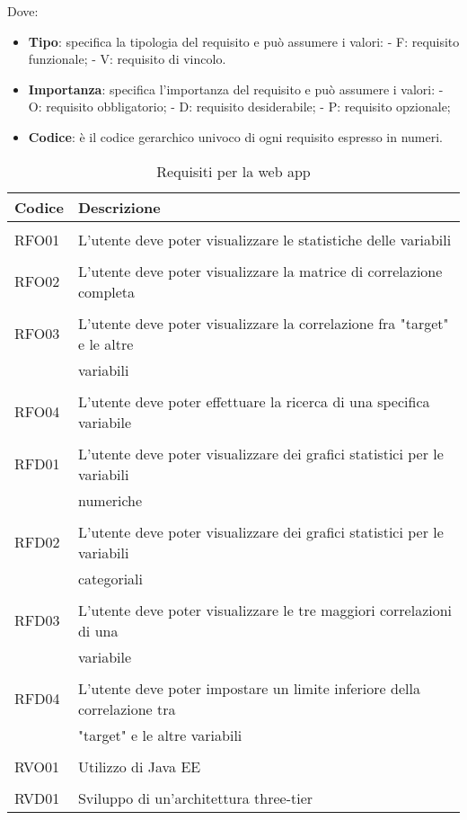 Dove:
\begin{itemize}
	\item \textbf{Tipo}: specifica la tipologia del requisito e può assumere i valori:
	\subitem - F: requisito funzionale;
	\subitem - V: requisito di vincolo.
	\item \textbf{Importanza}: specifica l'importanza del requisito e può assumere i valori:
	\subitem - O: requisito obbligatorio;
	\subitem - D: requisito desiderabile;
	\subitem - P: requisito opzionale; 
	\item  \textbf{Codice}: è il codice gerarchico univoco di ogni requisito espresso in numeri.
\end{itemize} 
\clearpage
\begin{table}[!h] %
	\caption{Requisiti per la web app}
	\label{tab:requisiti-app}
	\centering
	\begin{tabular}{ l | l }
		\textbf{Codice} & \textbf{Descrizione}\\
		\hline
		\hline
		\\[-2.5mm]
		RFO01 & L'utente deve poter visualizzare le statistiche delle variabili \\
		\hline
		\\[-2.5mm]
		RFO02 & L'utente deve poter visualizzare la matrice di correlazione completa \\
		\hline
		\\[-2.5mm]
		RFO03 & L'utente deve poter visualizzare la correlazione fra "target" e le altre \\ & variabili \\
		\hline
		\\[-2.5mm]
		RFO04 & L'utente deve poter effettuare la ricerca di una specifica variabile \\
		\hline
		\hline
		\\[-2.5mm]
		RFD01 & L'utente deve poter visualizzare dei grafici statistici per le variabili \\ & numeriche \\
		\hline
		\\[-2.5mm]
		RFD02 & L'utente deve poter visualizzare dei grafici statistici per le variabili \\ & categoriali \\
		\hline
		\\[-2.5mm]
		RFD03 & L'utente deve poter visualizzare le tre maggiori correlazioni di una \\ & variabile \\
		\hline
		\\[-2.5mm]
		RFD04 & L'utente deve poter impostare un limite inferiore della correlazione tra \\ & "target" e le altre variabili \\
		\hline
		\hline
		\\[-2.5mm]
		RVO01 & Utilizzo di Java EE \\
		\hline
		\hline
		\\[-2.5mm]
		RVD01 & Sviluppo di un'architettura three-tier \\
		\hline
		\end{tabular}
\end{table}%
